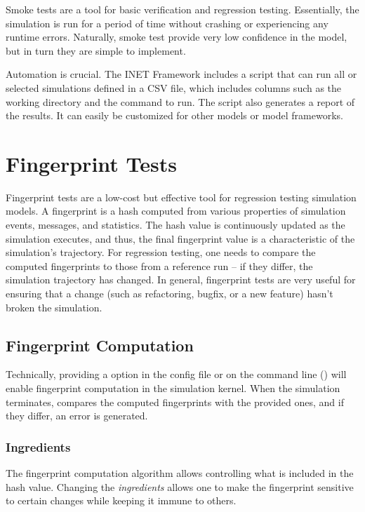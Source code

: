 Smoke tests are a tool for basic verification and regression testing.
Essentially, the simulation is run for a period of time without crashing or
experiencing any runtime errors. Naturally, smoke test provide very low confidence in
the model, but in turn they are simple to implement.

Automation is crucial. The INET Framework includes a script that can run all or
selected simulations defined in a CSV file, which includes columns such as the
working directory and the command to run. The script also generates a report of
the results. It can easily be customized for other models or model frameworks.


\section{Fingerprint Tests}
\label{sec:testing:fingerprint-tests}

Fingerprint tests are a low-cost but effective tool for regression testing
simulation models. A fingerprint is a hash computed from various properties
of simulation events, messages, and statistics. The hash value is continuously
updated as the simulation executes, and thus, the final fingerprint value is
a characteristic of the simulation's trajectory. For regression testing, one
needs to compare the computed fingerprints to those from a reference run --
if they differ, the simulation trajectory has changed. In general, fingerprint
tests are very useful for ensuring that a change (such as refactoring, bugfix,
or a new feature) hasn't broken the simulation.

\subsection{Fingerprint Computation}
\label{sec:testing:fingerprint-computation}

Technically, providing a  option in the config file or
on the command line () will enable fingerprint
computation in the {\opp} simulation kernel. When the simulation terminates,
{\opp} compares the computed fingerprints with the provided ones, and
if they differ, an error is generated.

\subsubsection{Ingredients}
\label{sec:testing:fingerprint-ingredients}

The fingerprint computation algorithm allows controlling what is included
in the hash value. Changing the \textit{ingredients} allows one to make the
fingerprint sensitive to certain changes while keeping it immune to
others.

